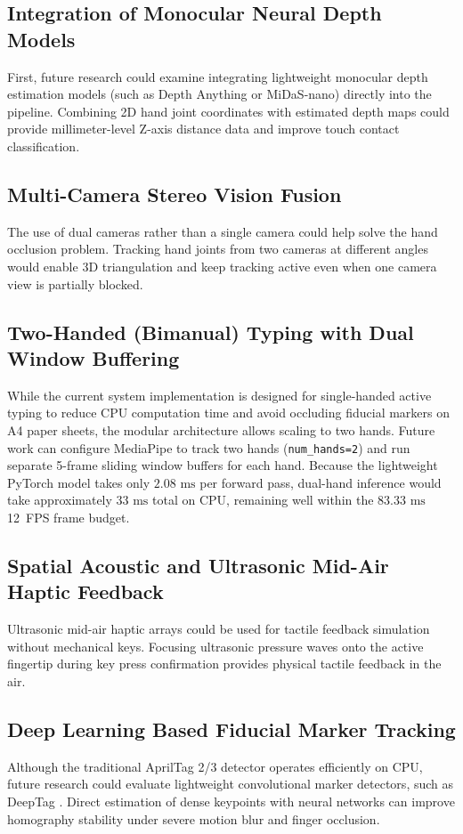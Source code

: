 \subsection{Integration of Monocular Neural Depth Models}
First, future research could examine integrating lightweight monocular depth estimation models (such as Depth Anything or MiDaS-nano) directly into the pipeline. Combining 2D hand joint coordinates with estimated depth maps could provide millimeter-level Z-axis distance data and improve touch contact classification.

\subsection{Multi-Camera Stereo Vision Fusion}
The use of dual cameras rather than a single camera could help solve the hand occlusion problem. Tracking hand joints from two cameras at different angles would enable 3D triangulation and keep tracking active even when one camera view is partially blocked.

\subsection{Two-Handed (Bimanual) Typing with Dual Window Buffering}
While the current system implementation is designed for single-handed active typing to reduce CPU computation time and avoid occluding fiducial markers on A4 paper sheets, the modular architecture allows scaling to two hands. Future work can configure MediaPipe to track two hands (\texttt{num\_hands=2}) and run separate 5-frame sliding window buffers for each hand. Because the lightweight PyTorch model takes only $2.08\text{ ms}$ per forward pass, dual-hand inference would take approximately $33\text{ ms}$ total on CPU, remaining well within the $83.33\text{ ms}$ 12~FPS frame budget.

\subsection{Spatial Acoustic and Ultrasonic Mid-Air Haptic Feedback}
Ultrasonic mid-air haptic arrays could be used for tactile feedback simulation without mechanical keys. Focusing ultrasonic pressure waves onto the active fingertip during key press confirmation provides physical tactile feedback in the air.

\subsection{Deep Learning Based Fiducial Marker Tracking}
Although the traditional AprilTag 2/3 detector operates efficiently on CPU, future research could evaluate lightweight convolutional marker detectors, such as DeepTag \cite{Zhang2022DeepTag}. Direct estimation of dense keypoints with neural networks can improve homography stability under severe motion blur and finger occlusion.

